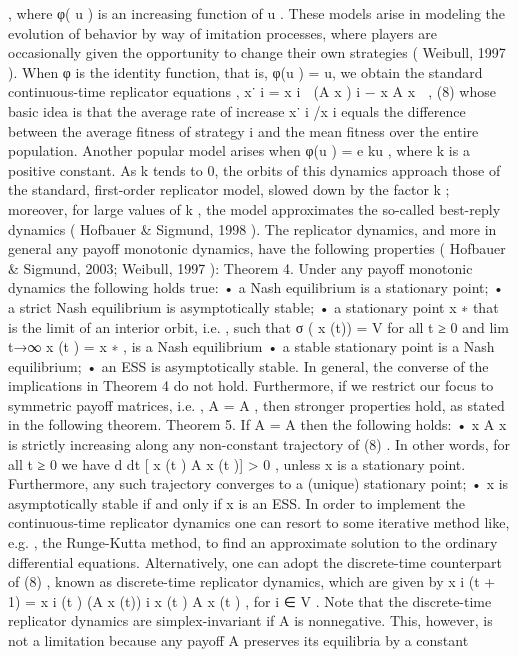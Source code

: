 \documentclass[a4paper]{article}
\begin{document}
,
where φ( u ) is an increasing function of u . These models arise in
modeling the evolution of behavior by way of imitation processes,
where players are occasionally given the opportunity to change
their own strategies ( Weibull, 1997 ).
When φ is the identity function, that is, φ(u ) = u, we obtain
the standard continuous-time replicator equations ,
x˙ i = x i

(A x ) i − x
	 A x

, (8)
whose basic idea is that the average rate of increase x˙ i /x i equals
the difference between the average fitness of strategy i and the
mean fitness over the entire population.
Another popular model arises when φ(u ) = e ku , where k is
a positive constant. As k tends to 0, the orbits of this dynamics
approach those of the standard, first-order replicator model,
slowed down by the factor k ; moreover, for large values of k , the
model approximates the so-called best-reply dynamics ( Hofbauer
& Sigmund, 1998 ).
The replicator dynamics, and more in general any payoff
monotonic dynamics, have the following properties ( Hofbauer &
Sigmund, 2003; Weibull, 1997 ):
Theorem 4. Under any payoff monotonic dynamics the following
holds true:
• a Nash equilibrium is a stationary point;
• a strict Nash equilibrium is asymptotically stable;
• a stationary point x ∗ that is the limit of an interior orbit, i.e. , such
that σ ( x (t)) = V for all t ≥ 0 and lim t→∞ x (t ) = x ∗
, is a Nash
equilibrium
• a stable stationary point is a Nash equilibrium;
• an ESS is asymptotically stable.
In general, the converse of the implications in Theorem 4 do
not hold.
Furthermore, if we restrict our focus to symmetric payoff
matrices, i.e. , A = A 	 , then stronger properties hold, as stated in
the following theorem.
Theorem 5. If A = A 	 then the following holds:
• x 	 A x is strictly increasing along any non-constant trajectory of
(8) . In other words, for all t ≥ 0 we have d
dt [ x (t ) 	 A x (t )] > 0 ,
unless x is a stationary point. Furthermore, any such trajectory
converges to a (unique) stationary point;
• x is asymptotically stable if and only if x is an ESS.
In order to implement the continuous-time replicator dynamics
one can resort to some iterative method like, e.g. , the Runge-Kutta
method, to find an approximate solution to the ordinary differential
equations. Alternatively, one can adopt the discrete-time
counterpart of (8) , known as discrete-time replicator dynamics,
which are given by
x i (t + 1) = x i (t )
(A x (t)) i
x (t ) 	 A x (t )
,
for i ∈ V . Note that the discrete-time replicator dynamics are
simplex-invariant if A is nonnegative. This, however, is not a limitation
because any payoff A preserves its equilibria by a constant
\end{document}
